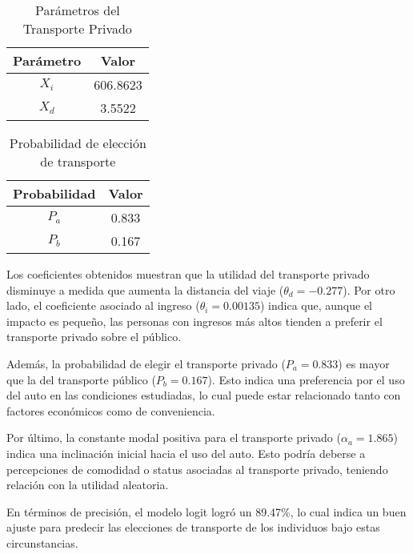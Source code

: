 \begin{table}[H]
    \centering
    \caption{Parámetros del Transporte Privado}
    \begin{tabular}{|c|c|}
    \hline
    Parámetro & Valor  \\ \hline
    $X_i$    & 606.8623     \\ \hline
    $X_{d}$    & 3.5522     \\ \hline
    \end{tabular}
    \label{tab:param}
\end{table}

\begin{table}[H]
    \centering
    \caption{Probabilidad de elección de transporte}
    \begin{tabular}{|c|c|}
    \hline
    Probabilidad & Valor  \\ \hline
    $P_{a}$    & 0.833    \\ \hline
    $P_{b}$    & 0.167     \\ \hline
    \end{tabular}
    \label{tab:prob}
\end{table}

Los coeficientes obtenidos muestran que la utilidad del transporte privado disminuye a medida que aumenta la distancia del viaje ($\theta_d = -0.277$). Por otro lado, el coeficiente asociado al ingreso ($\theta_i = 0.00135$) indica que, aunque el impacto es pequeño, las personas con ingresos más altos tienden a preferir el transporte privado sobre el público.

Además, la probabilidad de elegir el transporte privado ($P_a = 0.833$) es mayor que la del transporte público ($P_b = 0.167$). Esto indica una preferencia por el uso del auto en las condiciones estudiadas, lo cual puede estar relacionado tanto con factores económicos como de conveniencia.

Por último, la constante modal positiva para el transporte privado ($\alpha_a = 1.865$) indica una inclinación inicial hacia el uso del auto. Esto podría deberse a percepciones de comodidad o status asociadas al transporte privado, teniendo relación con la utilidad aleatoria.

En términos de precisión, el modelo logit logró un 89.47\%, lo cual indica un buen ajuste para predecir las elecciones de transporte de los individuos bajo estas circunstancias.